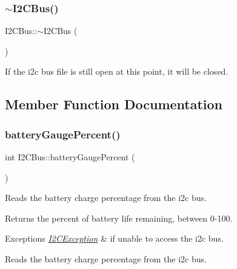\mbox{\label{classI2CBus_a70dac2923cd16ce06f0e73f7fc5bca89}} 
\subsubsection{\texorpdfstring{$\sim$\+I2\+C\+Bus()}{~I2CBus()}}
{\footnotesize\ttfamily I2\+C\+Bus\+::$\sim$\+I2\+C\+Bus (\begin{DoxyParamCaption}{ }\end{DoxyParamCaption})\hspace{0.3cm}{\ttfamily [virtual]}}

If the i2c bus file is still open at this point, it will be closed. 

\subsection{Member Function Documentation}
\mbox{\label{classI2CBus_a41d93fe98984595078aea7b54f475fbe}} 
\subsubsection{\texorpdfstring{battery\+Gauge\+Percent()}{batteryGaugePercent()}}
{\footnotesize\ttfamily int I2\+C\+Bus\+::battery\+Gauge\+Percent (\begin{DoxyParamCaption}{ }\end{DoxyParamCaption})}

Reads the battery charge percentage from the i2c bus.

\begin{DoxyReturn}{Returns}
the percent of battery life remaining, between 0-\/100.
\end{DoxyReturn}

\begin{DoxyExceptions}{Exceptions}
{\em \mbox{\hyperlink{structI2CBus_1_1I2CException}{I2\+C\+Exception}}} & if unable to access the i2c bus.\\
\hline
\end{DoxyExceptions}
Reads the battery charge percentage from the i2c bus. \mbox{\label{classI2CBus_a54c84733e096f9f08338c18072a02f71}} 
